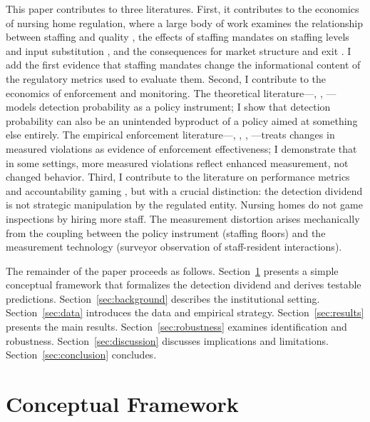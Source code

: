 \documentclass[12pt]{article}
\begin{document}
This paper contributes to three literatures. First, it contributes to the economics of nursing home regulation, where a large body of work examines the relationship between staffing and quality \citep{harrington2000, castle2011, lin2014}, the effects of staffing mandates on staffing levels and input substitution \citep{bowblis2011, matsudaira2014, bowblis2013, werner2026}, and the consequences for market structure and exit \citep{bowblisghattas2017}. I add the first evidence that staffing mandates change the informational content of the regulatory metrics used to evaluate them. Second, I contribute to the economics of enforcement and monitoring. The theoretical literature---\citet{becker1968}, \citet{stigler1970}, \citet{polinsky2000}---models detection probability as a policy instrument; I show that detection probability can also be an unintended byproduct of a policy aimed at something else entirely. The empirical enforcement literature---\citet{duflo2013}, \citet{olken2007}, \citet{shimshack2005}, \citet{gray2011}---treats changes in measured violations as evidence of enforcement effectiveness; I demonstrate that in some settings, more measured violations reflect enhanced measurement, not changed behavior. Third, I contribute to the literature on performance metrics and accountability gaming \citep{dranove2003, jacob2005, neal2010}, but with a crucial distinction: the detection dividend is not strategic manipulation by the regulated entity. Nursing homes do not game inspections by hiring more staff. The measurement distortion arises mechanically from the coupling between the policy instrument (staffing floors) and the measurement technology (surveyor observation of staff-resident interactions).

The remainder of the paper proceeds as follows. Section~\ref{sec:framework} presents a simple conceptual framework that formalizes the detection dividend and derives testable predictions. Section~\ref{sec:background} describes the institutional setting. Section~\ref{sec:data} introduces the data and empirical strategy. Section~\ref{sec:results} presents the main results. Section~\ref{sec:robustness} examines identification and robustness. Section~\ref{sec:discussion} discusses implications and limitations. Section~\ref{sec:conclusion} concludes.


\section{Conceptual Framework}
\label{sec:framework}
\end{document}
